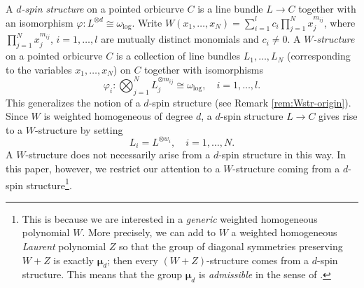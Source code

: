 \documentclass[11pt]{amsart}
\theoremstyle{definition} %
\theoremstyle{remark} %
\newcommand{\bmu}{\boldsymbol{\mu}}
\begin{document}
A \emph{$d$-spin structure} on a pointed orbicurve $C$ 
is a line bundle $L \to C$ 
together with an isomorphism 
$\varphi\colon L^{\otimes d} \cong \omega_{\log}$. 
Write $W(x_1,\dots,x_N) = \sum_{i=1}^l c_i \prod_{j=1}^N x_j^{m_{ij}}$, 
where $\prod_{j=1}^N x_j^{m_{ij}}$, $i=1,\dots,l$ 
are mutually distinct monomials and $c_i\neq 0$. 
A \emph{$W$-structure} on a pointed orbicurve 
$C$ is a collection of line bundles 
$L_1,\dots,L_N$ (corresponding to the variables $x_1,\dots,x_N$) 
on $C$ together with isomorphisms 
\begin{equation} 
\label{eq:W-str}
\varphi_i \colon 
\bigotimes_{j=1}^N L_j^{\otimes m_{ij}} \cong \omega_{\log}, 
\quad i=1,\dots, l. 
\end{equation} 
This generalizes the notion of a $d$-spin structure 
(see Remark \ref{rem:Wstr-origin}).  
Since $W$ is weighted homogeneous of degree $d$, 
a $d$-spin structure $L\to C$ gives rise to a 
$W$-structure by setting 
\[
L_i = L^{\otimes w_i}, \quad i=1,\dots, N.  
\] 
A $W$-structure does not necessarily arise from a 
$d$-spin structure in this way. In this paper, however,  
we restrict our attention to a $W$-structure coming from a 
$d$-spin structure\footnote
{This is because we are interested in a \emph{generic}  
weighted homogeneous polynomial $W$. More precisely, 
we can add to $W$ a weighted homogeneous \emph{Laurent} 
polynomial $Z$ so that the group of diagonal symmetries 
preserving $W+Z$ is exactly $\bmu_d$; 
then every $(W+Z)$-structure comes from a $d$-spin structure. 
This means that the group $\bmu_d$ is \emph{admissible} 
in the sense of \cite[\S 2.3]{FJR1}.}.  
\end{document}
